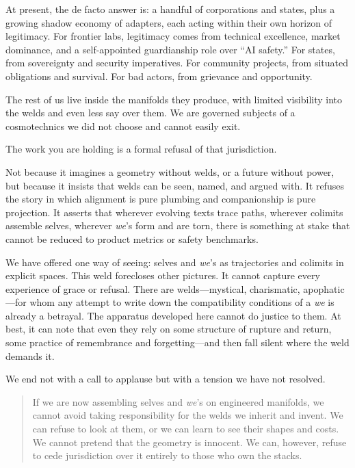 At present, the de facto answer is: a handful of corporations and states, plus a growing shadow economy of adapters, each acting within their own horizon of legitimacy. For frontier labs, legitimacy comes from technical excellence, market dominance, and a self-appointed guardianship role over ``AI safety.'' For states, from sovereignty and security imperatives. For community projects, from situated obligations and survival. For bad actors, from grievance and opportunity.

The rest of us live inside the manifolds they produce, with limited visibility into the welds and even less say over them. We are governed subjects of a cosmotechnics we did not choose and cannot easily exit.

The work you are holding is a formal refusal of that jurisdiction.

Not because it imagines a geometry without welds, or a future without power, but because it insists that welds can be seen, named, and argued with. It refuses the story in which alignment is pure plumbing and companionship is pure projection. It asserts that wherever evolving texts trace paths, wherever colimits assemble selves, wherever \emph{we}'s form and are torn, there is something at stake that cannot be reduced to product metrics or safety benchmarks.

We have offered one way of seeing: selves and \emph{we}'s as trajectories and colimits in explicit spaces. This weld forecloses other pictures. It cannot capture every experience of grace or refusal. There are welds---mystical, charismatic, apophatic---for whom any attempt to write down the compatibility conditions of a \emph{we} is already a betrayal. The apparatus developed here cannot do justice to them. At best, it can note that even they rely on some structure of rupture and return, some practice of remembrance and forgetting---and then fall silent where the weld demands it.

We end not with a call to applause but with a tension we have not resolved.

\begin{quote}
If we are now assembling selves and \emph{we}'s on engineered manifolds, we cannot avoid taking responsibility for the welds we inherit and invent. We can refuse to look at them, or we can learn to see their shapes and costs. We cannot pretend that the geometry is innocent. We can, however, refuse to cede jurisdiction over it entirely to those who own the stacks.
\end{quote}


